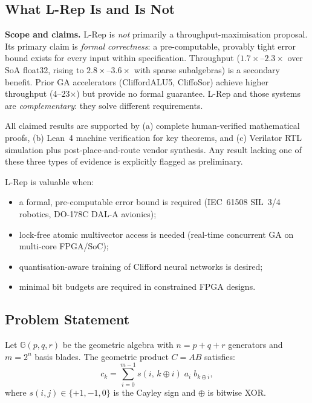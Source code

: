 \documentclass[11pt,a4paper]{article}
\theoremstyle{definition}
\theoremstyle{plain}
\theoremstyle{remark}
\newcommand{\GA}{\mathbb{G}}
\begin{document}
\subsection{What L-Rep Is and Is Not}

\begin{warningbox}
\textbf{Scope and claims.}
L-Rep is \emph{not} primarily a throughput-maximisation proposal.
Its primary claim is \emph{formal correctness}: a pre-computable, provably
tight error bound exists for every input within specification.
Throughput ($1.7\times$--$2.3\times$ over SoA float32, rising to
$2.8\times$--$3.6\times$ with sparse subalgebras) is a secondary benefit.
Prior GA accelerators (CliffordALU5, CliffoSor) achieve higher throughput
(4--23$\times$) but provide no formal guarantee.
L-Rep and those systems are \emph{complementary}: they solve different
requirements.

All claimed results are supported by (a) complete human-verified mathematical
proofs, (b) Lean~4 machine verification for key theorems, and (c) Verilator
RTL simulation plus post-place-and-route vendor synthesis.
Any result lacking one of these three types of evidence is explicitly flagged
as preliminary.
\end{warningbox}

L-Rep is valuable when:
\begin{itemize}
  \item a formal, pre-computable error bound is required
        (IEC~61508 SIL~3/4 robotics, DO-178C DAL-A avionics);
  \item lock-free atomic multivector access is needed
        (real-time concurrent GA on multi-core FPGA/SoC);
  \item quantisation-aware training of Clifford neural networks is desired;
  \item minimal bit budgets are required in constrained FPGA designs.
\end{itemize}

\subsection{Problem Statement}

Let $\GA(p,q,r)$ be the geometric algebra with $n=p+q+r$ generators and
$m=2^n$ basis blades.
The geometric product $C=AB$ satisfies:
\begin{equation}\label{eq:gaprod}
  c_k = \sum_{i=0}^{m-1} s(i,\,k{\oplus}i)\;\!a_i\;\!b_{k{\oplus}i},
\end{equation}
where $s(i,j)\in\{+1,-1,0\}$ is the Cayley sign and $\oplus$ is bitwise XOR.
\end{document}

